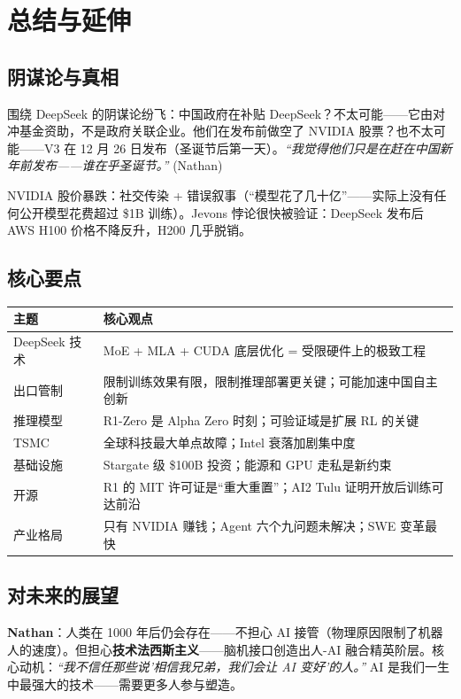 \documentclass[a4paper]{article}
\begin{document}
\section{总结与延伸}

\subsection{阴谋论与真相}

围绕 DeepSeek 的阴谋论纷飞：中国政府在补贴 DeepSeek？不太可能——它由对冲基金资助，不是政府关联企业。他们在发布前做空了 NVIDIA 股票？也不太可能——V3 在 12 月 26 日发布（圣诞节后第一天）。\textit{``我觉得他们只是在赶在中国新年前发布——谁在乎圣诞节。''} (Nathan)

NVIDIA 股价暴跌：社交传染 + 错误叙事（``模型花了几十亿''——实际上没有任何公开模型花费超过 \$1B 训练）。Jevons 悖论很快被验证：DeepSeek 发布后 AWS H100 价格不降反升，H200 几乎脱销。

\subsection{核心要点}

\begin{table}[H]
\centering
\begin{tabular}{lp{9cm}}
\toprule
\textbf{主题} & \textbf{核心观点} \\
\midrule
DeepSeek 技术 & MoE + MLA + CUDA 底层优化 = 受限硬件上的极致工程 \\
出口管制 & 限制训练效果有限，限制推理部署更关键；可能加速中国自主创新 \\
推理模型 & R1-Zero 是 Alpha Zero 时刻；可验证域是扩展 RL 的关键 \\
TSMC & 全球科技最大单点故障；Intel 衰落加剧集中度 \\
基础设施 & Stargate 级 \$100B 投资；能源和 GPU 走私是新约束 \\
开源 & R1 的 MIT 许可证是``重大重置''；AI2 Tulu 证明开放后训练可达前沿 \\
产业格局 & 只有 NVIDIA 赚钱；Agent 六个九问题未解决；SWE 变革最快 \\
\bottomrule
\end{tabular}
\end{table}

\subsection{对未来的展望}

\textbf{Nathan}：人类在 1000 年后仍会存在——不担心 AI 接管（物理原因限制了机器人的速度）。但担心\textbf{技术法西斯主义}——脑机接口创造出人-AI 融合精英阶层。核心动机：\textit{``我不信任那些说'相信我兄弟，我们会让 AI 变好'的人。''} AI 是我们一生中最强大的技术——需要更多人参与塑造。
\end{document}
